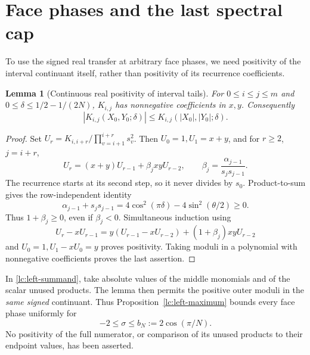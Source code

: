 \documentclass[11pt]{article}
\numberwithin{equation}{section}
\newtheorem{lemma}[theorem]{Lemma}
\theoremstyle{remark}\newtheorem{remark}[theorem]{Remark}
\begin{document}
\section{Face phases and the last spectral cap}\label{lc:phases}
To use the signed real transfer at arbitrary face phases, we need
positivity of the interval continuant itself, rather than positivity
of its recurrence coefficients.

\begin{lemma}[Continuous real positivity of interval tails]\label{lc:tail-positive}
For \(0\le i\le j\le m\) and
\(0\le\delta\le1/2-1/(2N)\), \(K_{i,j}\) has nonnegative coefficients
in \(x,y\). Consequently
\[
 |K_{i,j}(X_0,Y_0;\delta)|
                 \le K_{i,j}(|X_0|,|Y_0|;\delta).
\]
\end{lemma}
\begin{proof}
Set \(U_r=K_{i,i+r}/\prod_{v=i+1}^{i+r}s_v^2\).
Then \(U_0=1,U_1=x+y\), and for \(r\ge2\), \(j=i+r\),
\[
 U_r=(x+y)U_{r-1}+\beta_jxyU_{r-2},\qquad
                       \beta_j=\frac{\alpha_{j-1}}{s_js_{j-1}}.
\]
The recurrence starts at its second step, so it never divides by \(s_0\).
Product-to-sum gives the row-independent identity
\[
 \alpha_{j-1}+s_js_{j-1}
             =4\cos^2(\pi\delta)-4\sin^2(\theta/2)\ge0.
\]
Thus \(1+\beta_j\ge0\), even if \(\beta_j<0\). Simultaneous induction
using
\[
 U_r-xU_{r-1}
   =y(U_{r-1}-xU_{r-2})+(1+\beta_j)xyU_{r-2}
\]
and \(U_0=1,U_1-xU_0=y\) proves positivity. Taking moduli in a
polynomial with nonnegative coefficients proves the last assertion.
\end{proof}

In \eqref{lc:left-summand}, take absolute values of the middle
monomials and of the scalar unused products. The lemma then permits
the positive outer moduli in the \emph{same signed} continuant.
Thus Proposition~\ref{lc:left-maximum} bounds every face phase
uniformly for
\[
                       -2\le\sigma\le b_N:=2\cos(\pi/N).
\]
No positivity of the full numerator, or comparison of its unused
products to their endpoint values, has been asserted.
\end{document}
